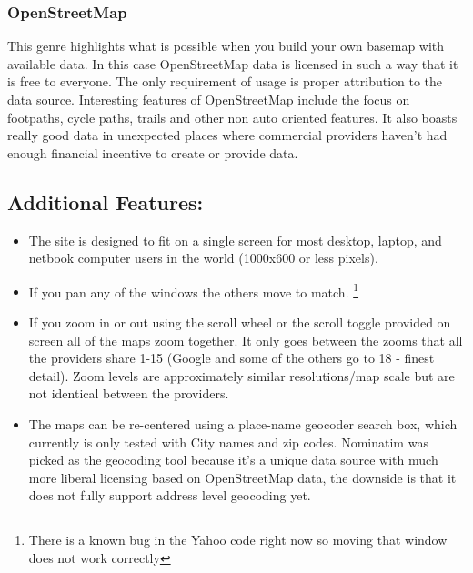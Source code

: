 \documentclass[12pt,letterpaper]{article}
\begin{document}
\subsubsection{OpenStreetMap}
This genre highlights what is possible when you build your own basemap with available data. In this case OpenStreetMap data is licensed in such a way that it is free to everyone. The only requirement of usage is proper attribution to the data source. Interesting features of OpenStreetMap include the focus on footpaths, cycle paths, trails and other non auto oriented features. It also boasts really good data in unexpected places where commercial providers haven't had enough financial incentive to create or provide data.




\subsection{Additional Features:}
\begin{itemize}
	\item The site is designed to fit on a single screen for most desktop, laptop, and netbook computer users in the world (1000x600 or less pixels).
	\item If you pan any of the windows the others move to match. \footnote{There is a known bug in the Yahoo code right now so moving that window does not work correctly}
	\item If you zoom in or out using the scroll wheel or the scroll toggle provided on screen all of the maps zoom together. It only goes between the zooms that all the providers share 1-15 (Google and some of the others go to 18 - finest detail). Zoom levels are approximately similar resolutions/map scale but are not identical between the providers.
	\item The maps can be re-centered using a place-name geocoder search box, which currently is only tested with City names and zip codes. Nominatim 	\parencite{Mapquest2012} was picked as the geocoding tool because it's a unique data source with much more liberal licensing based on OpenStreetMap data, the downside is that it does not fully support address level geocoding yet. 
\end{itemize}
\end{document}
